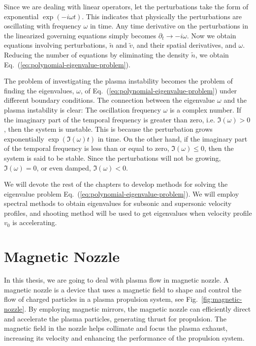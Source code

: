 Since we are dealing with linear operators, let the perturbations take the form of exponential $\exp(-i\omega t)$. This indicates that physically the perturbations are oscillating with frequency $\omega$ in time. Any time derivative on the perturbations in the linearized governing equations simply becomes $\partial_t \to -i\omega$. Now we obtain equations involving perturbations, $\tilde{n}$ and $\tilde{v}$, and their spatial derivatives, and $\omega$. Reducing the number of equations by eliminating the density $\tilde{n}$, we obtain Eq.~(\ref{eq:polynomial-eigenvalue-problem}).

The problem of investigating the plasma instability becomes the problem of finding the eigenvalues, $\omega$, of Eq.~(\ref{eq:polynomial-eigenvalue-problem}) under different boundary conditions. The connection between the eigenvalue $\omega$ and the plasma instability is clear: The oscillation frequency $\omega$ is a complex number. If the imaginary part of the temporal frequency is greater than zero, i.e. $\Im(\omega) > 0$, then the system is unstable. This is because the perturbation grows exponentially $\exp(\Im(\omega)t)$ in time. On the other hand, if the imaginary part of the temporal frequency is less than or equal to zero, $\Im(\omega) \leq 0$, then the system is said to be stable. Since the perturbations will not be growing, $\Im(\omega)=0$, or even damped, $\Im(\omega) < 0$.

We will devote the rest of the chapters to develop methods for solving the eigenvalue problem Eq.~(\ref{eq:polynomial-eigenvalue-problem}). We will employ spectral methods to obtain eigenvalues for subsonic and supersonic velocity profiles, and shooting method will be used to get eigenvalues when velocity profile $v_0$ is accelerating.

\section{Magnetic Nozzle}
In this thesis, we are going to deal with plasma flow in magnetic nozzle.
A magnetic nozzle is a device that uses a magnetic field to shape and control the flow of charged particles in a plasma propulsion system, see Fig.~\ref{fig:magnetic-nozzle}. By employing magnetic mirrors, the magnetic nozzle can efficiently direct and accelerate the plasma particles, generating thrust for propulsion. The magnetic field in the nozzle helps collimate and focus the plasma exhaust, increasing its velocity and enhancing the performance of the propulsion system.

